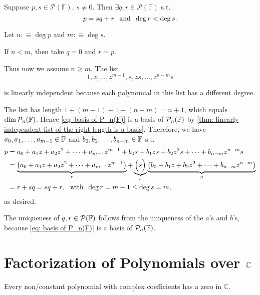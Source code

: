 \setcounter{thm}{8}
\begin{thm}
  \label{division-algorithm-for-polynomials}
  Suppose $p,s \in \mathcal{P} (\mathbb{F}), \, s\neq 0$. 
  Then $\exists q,r \in \mathcal{P} (\mathbb{F})$ s.t.
  \begin{equation}
    p=sq+r \;\;\, \text{and}\;\; \deg r < \deg s.
  \end{equation}
\end{thm}
\begin{prf}
  Let $n:\equiv \deg p$ and $m:\equiv \deg s$. 
  
  If $n<m$, then take $q=0$ and $r=p$.
  
  Thus now we assume $n \geq m$. The list
  \begin{equation}
    \label{eq: basis of P_n(F)}
    1, z, \ldots, z^{m-1}, s, zs, \ldots, z^{n-m}s
  \end{equation}
  
  is linearly independent because each polynomial in this list has a different degree.
  
  The list has length $1+(m-1)+1+(n-m)=n+1$, which equals $\dim \mathcal{P}_n(\mathbb{F})$. Hence \eqref{eq: basis of P_n(F)} is a basis of $\mathcal{P}_n(\mathbb{F})$ by \ref{thm: linearly independent list of the right length is a basis}. Therefore, we have $a_0, a_1, \ldots, a_{m-1} \in \mathbb{F}$ and $b_0, b_1, \ldots, b_{n-m} \in \mathbb{F}$ s.t.
  \begin{equation}
    \begin{aligned}
          p&=a_0 + a_1z + a_2z^2 + \cdots + a_{m-1} z^{m-1}
          + b_0 s + b_1 zs + b_2 z^2 s + \cdots + b_{n-m}z^{n-m}s \\
           &=\underbrace{\left(a_0 + a_1z + a_2z^2 + \cdots + a_{m-1} z^{m-1} \right)}_{r} + \underbrace{\Big(s\Big)}_{s} \underbrace{\left( b_0 + b_1 z + b_2 z^2 + \cdots + b_{n-m} z^{n-m} \right)}_{q} \\
           &=r+sq=sq+r, \;\;\, \text{with}\;\; \deg r = m-1 \leq \deg s = m,
    \end{aligned}
  \end{equation}
  as desired.
  
  The uniqueness of $q,r \in \mathcal{P}(\mathbb{F})$ follows from the uniqueness of the $a$'s and $b$'s, because \eqref{eq: basis of P_n(F)} is a basis of $\mathcal{P}_n(\mathbb{F})$.
\end{prf}
\section{Factorization of Polynomials over $\mathbb{C}$}
\setcounter{thm}{11}
\begin{thm}
  \label{fundamental-theorem-of-algebra-first-version}
  Every non\-/constant polynomial with complex coefficients has a zero in $\mathbb{C}$.
\end{thm}


